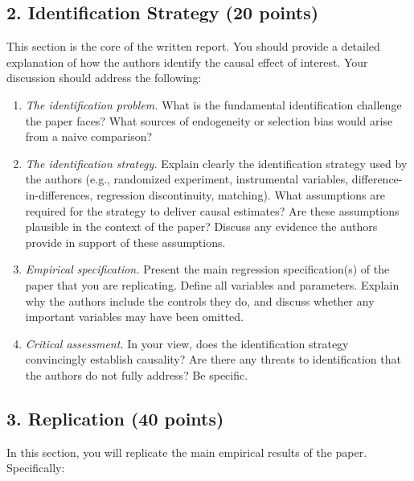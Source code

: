 \documentclass[letterpaper,12pt]{article}
\begin{document}
\subsection*{2. \quad Identification Strategy (20 points)}

This section is the core of the written report. You should provide a detailed explanation of how the authors identify the causal effect of interest. Your discussion should address the following:

\begin{enumerate}[label=(\alph*)]
    \item \textit{The identification problem.} What is the fundamental identification challenge the paper faces? What sources of endogeneity or selection bias would arise from a naive comparison?

    \item \textit{The identification strategy.} Explain clearly the identification strategy used by the authors (e.g., randomized experiment, instrumental variables, difference-in-differences, regression discontinuity, matching). What assumptions are required for the strategy to deliver causal estimates? Are these assumptions plausible in the context of the paper? Discuss any evidence the authors provide in support of these assumptions.

    \item \textit{Empirical specification.} Present the main regression specification(s) of the paper that you are replicating. Define all variables and parameters. Explain why the authors include the controls they do, and discuss whether any important variables may have been omitted.

    \item \textit{Critical assessment.} In your view, does the identification strategy convincingly establish causality? Are there any threats to identification that the authors do not fully address? Be specific.
\end{enumerate}

\subsection*{3. \quad Replication (40 points)}

In this section, you will replicate the main empirical results of the paper. Specifically:
\end{document}
